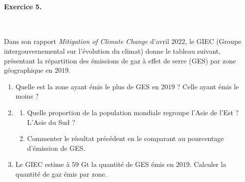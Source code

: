 \documentclass[11pt]{article}
\begin{document}
\paragraph{Exercice 5.}~\\[2mm]
\begin{minipage}{.45\textwidth}
  Dans son rapport \emph{Mitigation of Climate Change} d'avril $2022$, le GIEC
  (Groupe intergouvernemental sur l'évolution du climat) donne le tableau
  suivant, présentant la répartition des émissions de gaz à effet de serre (GES)
  par zone géographique en $2019$.
  \begin{enumerate}
    \item Quelle est la zone ayant émis le plus de GES en $2019$ ? Celle ayant
      émis le moins ?
    \item \begin{enumerate}
        \item Quelle proportion de la population mondiale regroupe l'Asie de
          l'Est ? L'Asie du Sud ?
        \item Commenter le résultat précédent en le comparant au pourcentage
          d'émission de GES.
      \end{enumerate}
  \item Le GIEC estime à $59$ Gt la quantité de GES émis en $2019$. Calculer la
    quantité de gaz émis par zone.
  \end{enumerate}
\end{minipage}
\end{document}
